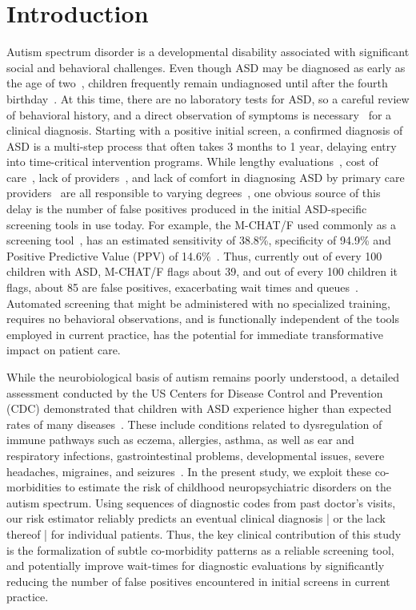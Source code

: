 \documentclass[3p,super,numbers,sort&compress,10pt]{elsarticle}
\begin{document}
\section*{Introduction}
%
Autism spectrum disorder is a developmental disability associated with significant social  and behavioral challenges.
Even though ASD may be diagnosed as early as the  age of two~\cite{cdc},  children frequently remain undiagnosed  until after the fourth birthday~\cite{pmid24529515}. At this
time, there are no laboratory tests for ASD, so a careful review of behavioral history, and a direct
observation of symptoms is
necessary~\cite{volkmar2014practice,hyman2020identification} for a clinical diagnosis.  Starting with a positive initial screen, a confirmed diagnosis of ASD is a   multi-step process that often takes 3 months to 1 year,  delaying entry into time-critical intervention programs. While   lengthy evaluations~\cite{kalb2012determinants}, cost of care~\cite{bisgaier2011access},  lack of providers~\cite{fenikile2015barriers}, and lack of comfort in diagnosing ASD by primary care providers~\cite{fenikile2015barriers} are all responsible to varying degrees~\cite{gordon2016whittling}, one  obvious source of this delay is the number of false positives produced in the initial ASD-specific screening tools in use today. For example, the  M-CHAT/F used commonly as a screening tool~\cite{robins2014validation,hyman2020identification},  has an estimated  sensitivity of 38.8\%, specificity of 94.9\% and Positive Predictive Value (PPV) of 14.6\%~\cite{pmid31562252}. Thus,  currently  out of every 100 children with ASD,  M-CHAT/F flags about 39, and out of every 100 children it flags, about 85 are false positives, exacerbating  wait times and queues~\cite{gordon2016whittling}.  Automated   screening  that might be administered with  no specialized training, requires no behavioral observations, and is functionally independent of the tools employed in current practice,  has the potential for  immediate transformative  impact on patient care.


While the neurobiological basis of autism remains poorly understood,  a detailed assessment conducted by the US Centers for Disease Control and Prevention (CDC) demonstrated that  children with ASD experience  higher than expected rates of many diseases~\cite{cdc}. These include conditions related to dysregulation of immune pathways such as eczema, allergies, asthma, as well as ear and respiratory infections, gastrointestinal problems, developmental issues, severe headaches, migraines, and seizures~\cite{pmid30733689,pmid22511918}. In the present study, we exploit   these   co-morbidities to estimate the risk of  childhood neuropsychiatric disorders on the autism spectrum. Using sequences of diagnostic codes from past doctor's visits, our risk estimator reliably
predicts an eventual clinical  diagnosis | or the lack thereof |  for individual patients.
Thus, the key clinical  contribution of this study is the formalization  of subtle co-morbidity patterns as a reliable screening tool, and potentially  improve wait-times for diagnostic evaluations by significantly reducing the number of false positives encountered in initial screens in current practice.
\end{document}
